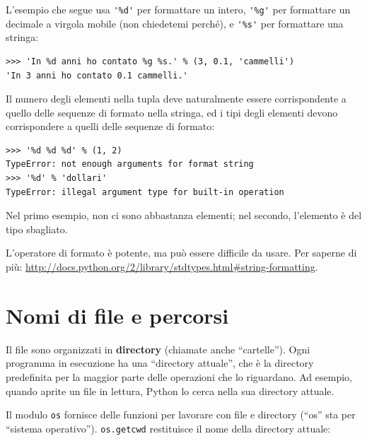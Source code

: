 \documentclass[10pt]{book}
\begin{document}
L'esempio che segue usa \verb"'%d'" per formattare un intero,
\verb"'%g'" per formattare un decimale a virgola mobile (non chiedetemi perché), e \verb"'%s'" per formattare una stringa:

\begin{verbatim}
>>> 'In %d anni ho contato %g %s.' % (3, 0.1, 'cammelli')
'In 3 anni ho contato 0.1 cammelli.'
\end{verbatim}
%
Il numero degli elementi nella tupla deve naturalmente essere
   corrispondente a quello delle sequenze di formato nella stringa, ed i tipi degli elementi devono corrispondere a quelli delle sequenze di formato:

\begin{verbatim}
>>> '%d %d %d' % (1, 2)
TypeError: not enough arguments for format string
>>> '%d' % 'dollari'
TypeError: illegal argument type for built-in operation
\end{verbatim}
%
Nel primo esempio, non ci sono abbastanza elementi; nel secondo, l'elemento è del tipo sbagliato.

L'operatore di formato è potente, ma può essere difficile da usare. Per saperne di più: 
\url{http://docs.python.org/2/library/stdtypes.html#string-formatting}.




\section{Nomi di file e percorsi}
\label{paths}

Il file sono organizzati in {\bf directory} (chiamate anche ``cartelle'').
Ogni programma in esecuzione ha una ``directory attuale'', che è la directory predefinita per la maggior parte delle operazioni che lo riguardano.
Ad esempio, quando aprite un file in lettura, Python lo cerca nella sua directory attuale.

Il modulo {\tt os} fornisce delle funzioni per lavorare con file e directory (``os'' sta per ``sistema operativo'').  {\tt os.getcwd} restituisce il nome della directory attuale:
\end{document}
